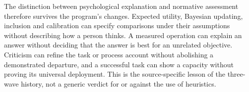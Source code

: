 The distinction between psychological explanation and normative assessment
therefore survives the program's changes. Expected utility, Bayesian
updating, inclusion and calibration can specify comparisons under their
assumptions without describing how a person thinks. A measured operation
can explain an answer without deciding that the answer is best for an
unrelated objective. Criticism can refine the task or process account
without abolishing a demonstrated departure, and a successful task can
show a capacity without proving its universal deployment. This is the
source-specific lesson of the three-wave history, not a generic verdict
for or against the use of heuristics.
